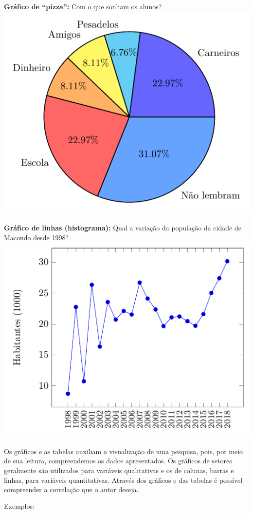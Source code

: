 {{\textbf{Gráfico de ``pizza'':} {Com o que sonham os alunos?}}\\
\medskip\hfill\includegraphics[width=.5\textwidth]{./tikz/piechart.pdf}\hfill\medskip

{\textbf{Gráfico de linhas (histograma):} {Qual a variação da população da cidade de Macondo desde 1998?}}\\
\medskip\hfill\includegraphics[width=.5\textwidth]{./tikz/linechart.pdf}\hfill\medskip


Os gráficos e as tabelas auxiliam a visualização de uma pesquisa, pois,
por meio de sua leitura, compreendemos os dados apresentados. Os
gráficos de setores geralmente são utilizados para variáveis
qualitativas e os de colunas, barras e linhas, para variáveis
quantitativas. Através dos gráficos e das tabelas é possível compreender
a correlação que o autor deseja.

\medskip \noindent Exemplos:

}

